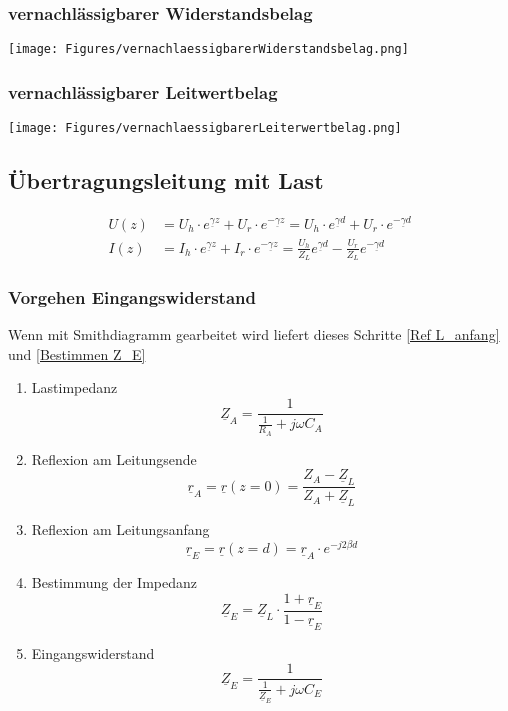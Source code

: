 \subsubsection{vernachlässigbarer Widerstandsbelag}
\texttt{[image: Figures/vernachlaessigbarerWiderstandsbelag.png]}


\subsubsection{vernachlässigbarer Leitwertbelag}
\texttt{[image: Figures/vernachlaessigbarerLeiterwertbelag.png]}

\subsection{Übertragungsleitung mit Last}

\begin{align*}
    U(z) & = U_h\cdot  e^{\underline{\gamma} z} + U_r\cdot  e^{-\underline{\gamma} z} = U_h\cdot  e^{\underline{\gamma} d} + U_r\cdot  e^{-\underline{\gamma} d}           \\
    I(z) & = I_h\cdot  e^{\underline{\gamma} z} + I_r\cdot  e^{-\underline{\gamma} z} = \frac{U_h}{Z_L}e^{\underline{\gamma} d} - \frac{U_r}{Z_L}e^{-\underline{\gamma} d}
\end{align*}

\subsubsection{Vorgehen Eingangswiderstand}
Wenn mit Smithdiagramm gearbeitet wird liefert dieses Schritte \ref{Ref L_anfang} und \ref{Bestimmen Z_E}
\begin{enumerate}
    \item Lastimpedanz
          \[ \underline{Z}_A = \dfrac{1}{\frac{1}{R_A} + j \omega C_A} \]
    \item Reflexion am Leitungsende
          \[ \underline{r}_A = \underline{r}(z=0) = \dfrac{Z_A - \underline{Z}_L}{Z_A + \underline{Z}_L} \]
    \item Reflexion am Leitungsanfang \label{Ref L_anfang}
          \[ \underline{r}_E = \underline{r}(z=d) =  \underline{r}_A \cdot e^{-j 2 \beta d}\]
    \item Bestimmung der Impedanz \label{Bestimmen Z_E}
          \[ \underline{Z}_E = \underline{Z}_L \cdot \dfrac{1 + \underline{r}_E}{1 - \underline{r}_E}\]
    \item Eingangswiderstand
          \[ \underline{Z}_E = \dfrac{1}{\frac{1}{\underline{Z}_E} + j \omega C_E}\]
\end{enumerate}


